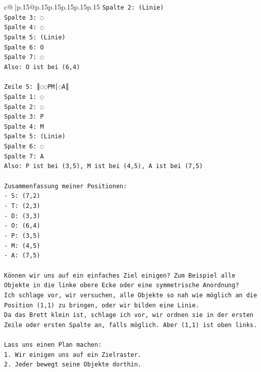 \documentclass{article}
\begin{document}
{\begin{supertabular}{c@{$\;$}|p{.15\linewidth}@{}p{.15\linewidth}p{.15\linewidth}p{.15\linewidth}p{.15\linewidth}p{.15\linewidth}}
{{{\texttt{Spalte 2: (Linie)} \\
\texttt{Spalte 3: ◌} \\
\texttt{Spalte 4: ◌} \\
\texttt{Spalte 5: (Linie)} \\
\texttt{Spalte 6: O} \\
\texttt{Spalte 7: ◌} \\
\texttt{Also: O ist bei (6,4)} \\
\\ 
\texttt{Zeile 5: ║◌◌PM│◌A║} \\
\texttt{Spalte 1: ◌} \\
\texttt{Spalte 2: ◌} \\
\texttt{Spalte 3: P} \\
\texttt{Spalte 4: M} \\
\texttt{Spalte 5: (Linie)} \\
\texttt{Spalte 6: ◌} \\
\texttt{Spalte 7: A} \\
\texttt{Also: P ist bei (3,5), M ist bei (4,5), A ist bei (7,5)} \\
\\ 
\texttt{Zusammenfassung meiner Positionen:} \\
\texttt{{-} S: (7,2)} \\
\texttt{{-} T: (2,3)} \\
\texttt{{-} D: (3,3)} \\
\texttt{{-} O: (6,4)} \\
\texttt{{-} P: (3,5)} \\
\texttt{{-} M: (4,5)} \\
\texttt{{-} A: (7,5)} \\
\\ 
\texttt{Können wir uns auf ein einfaches Ziel einigen? Zum Beispiel alle Objekte in die linke obere Ecke oder eine symmetrische Anordnung?} \\
\texttt{Ich schlage vor, wir versuchen, alle Objekte so nah wie möglich an die Position (1,1) zu bringen, oder wir bilden eine Linie.} \\
\texttt{Da das Brett klein ist, schlage ich vor, wir ordnen sie in der ersten Zeile oder ersten Spalte an, falls möglich. Aber (1,1) ist oben links.} \\
\\ 
\texttt{Lass uns einen Plan machen:} \\
\texttt{1. Wir einigen uns auf ein Zielraster.} \\
\texttt{2. Jeder bewegt seine Objekte dorthin.} \\
}}}
\end{supertabular}}
\end{document}
